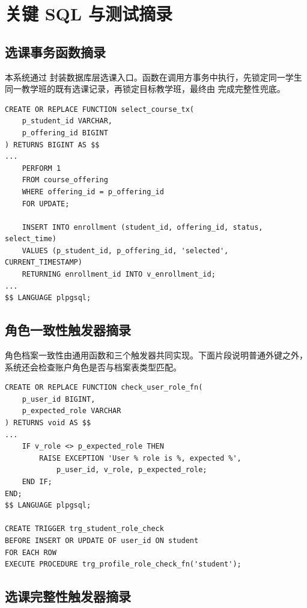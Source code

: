 \chapter{关键 SQL 与测试摘录}

\section{选课事务函数摘录}

本系统通过  封装数据库层选课入口。函数在调用方事务中执行，先锁定同一学生同一教学班的既有选课记录，再锁定目标教学班，最终由  完成完整性兜底。

\begin{lstlisting}[style=sqlstyle]
CREATE OR REPLACE FUNCTION select_course_tx(
    p_student_id VARCHAR,
    p_offering_id BIGINT
) RETURNS BIGINT AS $$
...
    PERFORM 1
    FROM course_offering
    WHERE offering_id = p_offering_id
    FOR UPDATE;

    INSERT INTO enrollment (student_id, offering_id, status, select_time)
    VALUES (p_student_id, p_offering_id, 'selected', CURRENT_TIMESTAMP)
    RETURNING enrollment_id INTO v_enrollment_id;
...
$$ LANGUAGE plpgsql;
\end{lstlisting}

\section{角色一致性触发器摘录}

角色档案一致性由通用函数和三个触发器共同实现。下面片段说明普通外键之外，系统还会检查账户角色是否与档案表类型匹配。

\begin{lstlisting}[style=sqlstyle]
CREATE OR REPLACE FUNCTION check_user_role_fn(
    p_user_id BIGINT,
    p_expected_role VARCHAR
) RETURNS void AS $$
...
    IF v_role <> p_expected_role THEN
        RAISE EXCEPTION 'User % role is %, expected %',
            p_user_id, v_role, p_expected_role;
    END IF;
END;
$$ LANGUAGE plpgsql;

CREATE TRIGGER trg_student_role_check
BEFORE INSERT OR UPDATE OF user_id ON student
FOR EACH ROW
EXECUTE PROCEDURE trg_profile_role_check_fn('student');
\end{lstlisting}

\section{选课完整性触发器摘录}

